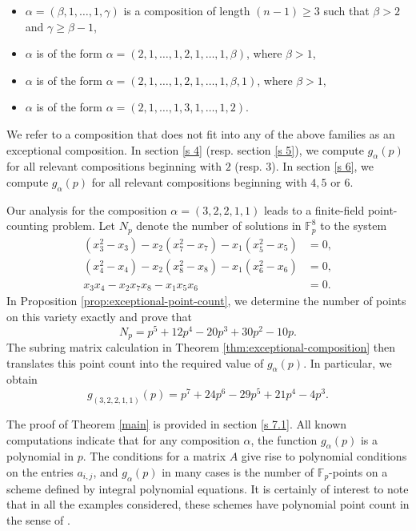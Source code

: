 \documentclass[a4paper]{amsart}
\numberwithin{equation}{section}
\theoremstyle{remark}
\newcommand{\F}{\mathbb{F}}
\begin{document}
 \begin{itemize}
 \item $\alpha=(\beta,1, \dots, 1, \gamma)$ is a composition of length $(n-1)\geq 3$ such that $\beta>2$ and $\gamma\geq \beta-1$,
 \item $\alpha$ is of the form $\alpha=(2,1,\dots, 1, 2, 1,\dots, 1, \beta)$, where $\beta>1$,
 \item $\alpha$ is of the form $\alpha=(2,1,\dots, 1, 2, 1,\dots, 1, \beta,1)$, where $\beta>1$,
 \item $\alpha$ is of the form $\alpha=(2,1,\dots, 1, 3, 1,\dots, 1, 2)$.
 \end{itemize}

 \par We refer to a composition that does not fit into any of the above families as an exceptional composition. In section \ref{s 4} (resp. section \ref{s 5}), we compute $g_{\alpha}(p)$ for all relevant compositions beginning with $2$ (resp. $3$). In section \ref{s 6}, we compute $g_{\alpha}(p)$ for all relevant compositions beginning with $4,5$ or $6$.
 \par Our analysis for the composition $\alpha=(3,2,2,1,1)$ leads to a finite-field point-counting problem. Let $N_p$ denote the number of solutions in $\F_p^8$ to the system
\[
\begin{split}
(x_3^2-x_3)-x_2(x_7^2-x_7)-x_1(x_5^2-x_5)&=0,\\
(x_4^2-x_4)-x_2(x_8^2-x_8)-x_1(x_6^2-x_6)&=0,\\
x_3x_4-x_2x_7x_8-x_1x_5x_6&=0.
\end{split}
\]
In Proposition \ref{prop:exceptional-point-count}, we determine the number of points on this variety exactly and prove that
\[
N_p=p^5+12p^4-20p^3+30p^2-10p.
\]
The subring matrix calculation in Theorem \ref{thm:exceptional-composition} then translates this point count into the required value of $g_\alpha(p)$. In particular, we obtain
\[
g_{(3,2,2,1,1)}(p)
=
p^7+24p^6-29p^5+21p^4-4p^3.
\]

 \par The proof of Theorem \ref{main} is provided in section \ref{s 7.1}. All known computations indicate that for any composition $\alpha$, the function $g_\alpha(p)$ is a polynomial in $p$. The conditions for a matrix $A$ give rise to polynomial conditions on the entries $a_{i,j}$, and $g_\alpha(p)$ in many cases is the number of $\F_p$-points on a scheme defined by integral polynomial equations. It is certainly of interest to note that in all the examples considered, these schemes have polynomial point count in the sense of \cite[p.616, ll. -6 to -2]{hausel2008mixed}.
 
\end{document}

